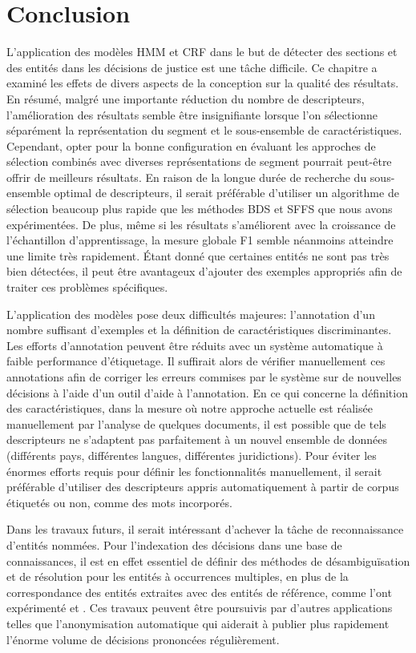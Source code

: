 \section{Conclusion}
\label{sec:structuration:conclusion}
L'application des modèles HMM et CRF dans le but de détecter des sections et des entités dans les décisions de justice est une tâche difficile. Ce chapitre a examiné les effets de divers aspects de la conception sur la qualité des résultats. En résumé, malgré une importante réduction du nombre de descripteurs, l'amélioration des résultats semble être insignifiante lorsque l'on sélectionne séparément la représentation du segment et le sous-ensemble de caractéristiques. Cependant, opter pour la bonne configuration en évaluant les approches de sélection combinés avec diverses représentations de segment pourrait peut-être offrir de meilleurs résultats. En raison de la longue durée de recherche du sous-ensemble optimal de descripteurs, il serait préférable d'utiliser un algorithme de sélection beaucoup plus rapide que les méthodes BDS et SFFS que nous avons expérimentées. De plus, même si les résultats s'améliorent avec la croissance de l'échantillon d'apprentissage, la mesure globale F1 semble néanmoins atteindre une limite très rapidement. Étant donné que certaines entités ne sont pas très bien détectées, il peut être avantageux d'ajouter des exemples appropriés afin de traiter ces problèmes spécifiques.

L'application des modèles pose deux difficultés majeures: l'annotation d'un nombre suffisant d'exemples et la définition de caractéristiques discriminantes. Les efforts d'annotation peuvent être réduits avec un système automatique à faible performance d'étiquetage. Il suffirait alors de vérifier manuellement ces annotations afin de corriger les erreurs commises par le système sur de nouvelles décisions à l'aide d'un outil d'aide à l'annotation. En ce qui concerne la définition des caractéristiques, dans la mesure où notre approche actuelle est réalisée manuellement par l'analyse de quelques documents, il est possible que de tels descripteurs ne s'adaptent pas parfaitement à un nouvel ensemble de données (différents pays, différentes langues, différentes juridictions). Pour éviter les énormes efforts requis pour définir les fonctionnalités manuellement, il serait préférable d'utiliser des descripteurs appris automatiquement à partir de corpus étiquetés ou non, comme des mots incorporés.

Dans les travaux futurs, il serait intéressant d'achever la tâche de reconnaissance d'entités nommées. Pour l'indexation des décisions dans une base de connaissances, il est en effet essentiel de définir des méthodes de désambiguïsation et de résolution pour les entités à occurrences multiples, en plus de la correspondance des entités extraites avec des entités de référence, comme l'ont expérimenté \citet{dozier2010legalnerr} et \citet{cardellino2017legalNERCL}. Ces travaux peuvent être poursuivis par d'autres applications telles que l'anonymisation automatique qui aiderait à publier plus rapidement l'énorme volume de décisions prononcées régulièrement.